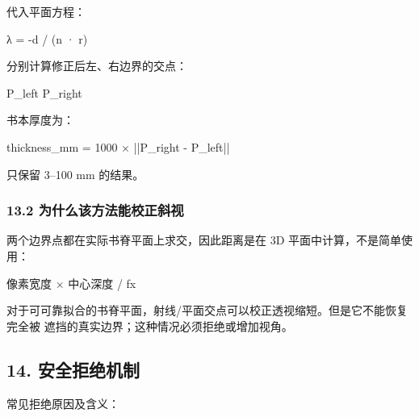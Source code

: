 \documentclass[
  chinese,
  11pt,
  a4paper,
]{article}
\newenvironment{Shaded}{\begin{snugshade}}{\end{snugshade}}
\newcommand{\NormalTok}[1]{#1}
\begin{document}
代入平面方程：

\begin{Shaded}
\begin{Highlighting}[]
\NormalTok{λ = {-}d / (n · r)}
\end{Highlighting}
\end{Shaded}

分别计算修正后左、右边界的交点：

\begin{Shaded}
\begin{Highlighting}[]
\NormalTok{P\_left}
\NormalTok{P\_right}
\end{Highlighting}
\end{Shaded}

书本厚度为：

\begin{Shaded}
\begin{Highlighting}[]
\NormalTok{thickness\_mm = 1000 × ||P\_right {-} P\_left||}
\end{Highlighting}
\end{Shaded}

只保留 3--100 mm 的结果。

\subsubsection{13.2
为什么该方法能校正斜视}\label{132-ux4e3aux4ec0ux4e48ux8be5ux65b9ux6cd5ux80fdux6821ux6b63ux659cux89c6}

两个边界点都在实际书脊平面上求交，因此距离是在 3D
平面中计算，不是简单使用：

\begin{Shaded}
\begin{Highlighting}[]
\NormalTok{像素宽度 × 中心深度 / fx}
\end{Highlighting}
\end{Shaded}

对于可可靠拟合的书脊平面，射线/平面交点可以校正透视缩短。但是它不能恢复完全被
遮挡的真实边界；这种情况必须拒绝或增加视角。

\subsection{14.
安全拒绝机制}\label{14-ux5b89ux5168ux62d2ux7eddux673aux5236}

常见拒绝原因及含义：
\end{document}
